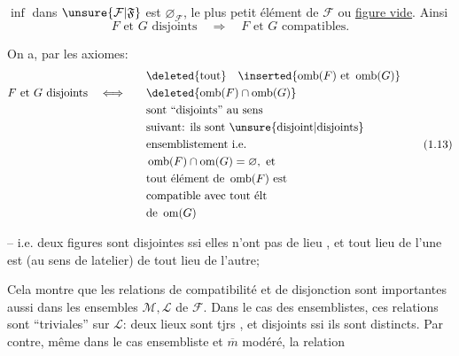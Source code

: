 $\inf$ dans $\unsure{\mathcal{F}|\mathfrak{F}}$ est $\varnothing_{\mathcal{F}}$, le plus petit élément de $\mathcal{F}$ ou \uline{figure vide}. Ainsi
\[
F\text{ et }G\text{ disjoints}\quad\Longrightarrow\quad F\text{ et }G\text{ compatibles}.
\]

On a, par les axiomes:
\[
\begin{aligned}
&&&\deleted{\text{tout}}\quad\inserted{\operatorname{omb}(F)\text{ et }\operatorname{omb}(G)}\\
F\text{ et }G\text{ disjoints}&\quad\Longleftrightarrow\quad&&\deleted{\operatorname{omb}(F)\cap\operatorname{omb}(G)}\\
&&&\text{sont ``disjoints'' au sens}\\
&&&\text{suivant: ils sont \unsure{disjoint|disjoints}}\\
&&&\text{ensemblistement i.e.}\\
&&&\operatorname{omb}(F)\cap\operatorname{om}(G)=\varnothing,\ \text{et}\\
&&&\text{tout élément de }\operatorname{omb}(F)\text{ est}\\
&&&\text{compatible avec tout élt}\\
&&&\text{de }\operatorname{om}(G)
\end{aligned}\tag*{(1.13)}
\]

-- i.e. deux figures sont disjointes ssi elles n'ont pas de lieu , et tout lieu de l'une est   (au sens de latelier) de tout lieu de l'autre;

Cela montre que les relations de compatibilité et de disjonction sont importantes aussi dans les  ensembles $\mathcal{M},\mathcal{L}$ de $\mathcal{F}$. Dans le cas des  ensemblistes, ces relations sont ``triviales'' sur $\mathcal{L}$: deux lieux sont tjrs  , et disjoints ssi ils sont distincts. Par contre, même dans le cas ensembliste et $\overline m$ modéré, la relation
